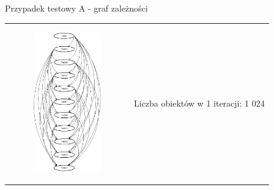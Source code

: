 \documentclass{beamer}
\begin{document}
\begin{frame}{Przypadek testowy A - graf zależności}
\begin{table}
     \begin{small}
	\begin{tabular}{ p{7cm} p{2cm} }
	
	\begin{minipage}{.7\textwidth}
\begin{figure}
	\begin{center}
  		\includegraphics[height=6cm]{TestA.png}
	\end{center}
\end{figure}
   	 \end{minipage}
&
	\begin{minipage}{.3\textwidth}
\tiny{Liczba obiektów w 1 iteracji: 1 024}
   	 \end{minipage}

	\end{tabular}
     \end{small}
\end{table}
\end{frame}
\end{document}
